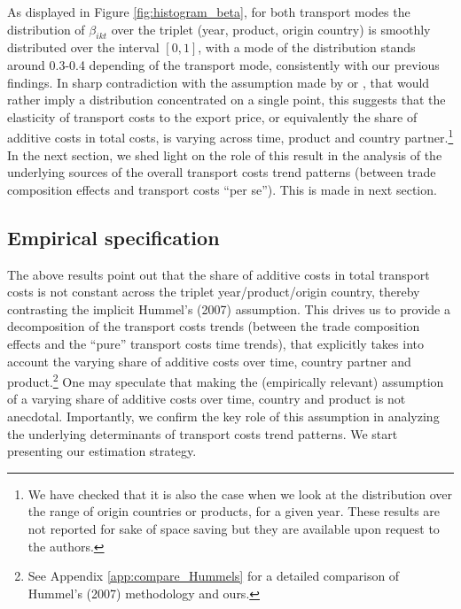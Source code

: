 \documentclass[a4paper,11pt]{article}
\begin{document}
As displayed in Figure \ref{fig:histogram_beta}, for both transport modes the distribution of $\beta_{ikt}$ over the triplet (year, product, origin country) is smoothly distributed over the interval $[0,1]$, with a mode of the distribution stands around 0.3-0.4 depending of the transport mode, consistently with our previous findings. In sharp contradiction with the assumption made by  \cite{hummels_skiba} or \cite{hummels2007}, that would rather imply a distribution concentrated on a single point, this suggests that the elasticity of transport costs to the export price, or equivalently the share of additive costs in total costs, is varying across time, product and country partner.\footnote{We have checked that it is also the case when we look at the distribution over the range of origin countries or products, for a given year. These results are not reported for sake of space saving but they are available upon request to the authors.} In the next section, we shed light on the role of this result in the analysis of the  underlying sources of the overall transport costs trend patterns (between trade composition effects and transport costs ``per se''). This is made in next section.

\subsection{Empirical specification}

The above results point out that the share of additive costs in total transport costs is not constant across the triplet year/product/origin country, thereby contrasting the implicit Hummel's (2007) assumption. This drives us to provide a decomposition of the transport costs trends (between the trade composition effects and the ``pure'' transport costs time trends), that explicitly takes into account the varying share of additive costs over time, country partner and product.\footnote{See Appendix \ref{app:compare_Hummels} for a detailed comparison of Hummel's (2007) methodology and ours.} One may speculate that making the (empirically relevant) assumption of a varying share of additive costs over time, country and product is not anecdotal. Importantly, we confirm the key role of this assumption in analyzing the underlying determinants of transport costs trend patterns. We start presenting our estimation strategy.\smallskip
\end{document}

